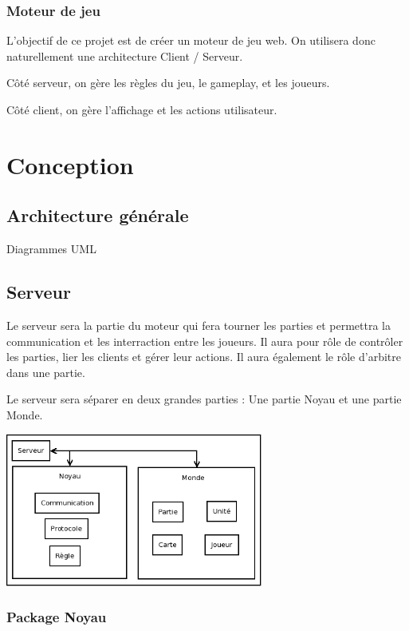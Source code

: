 \documentclass[a4paper,10pt]{report}
\begin{document}
      \subsection{Moteur de jeu}

	L'objectif de ce projet est de créer un moteur de jeu web. On utilisera donc naturellement une architecture Client / Serveur. 

	Côté serveur, on gère les règles du jeu, le gameplay, et les joueurs. 

	Côté client, on gère l'affichage et les actions utilisateur. 


  \chapter{Conception}

    \section{Architecture générale}

      Diagrammes UML


    \section{Serveur}

      Le serveur sera la partie du moteur qui fera tourner les parties et permettra la communication et les interraction entre les joueurs. Il aura pour rôle de contrôler les parties, lier les clients et gérer leur actions. Il aura également le rôle d'arbitre dans une partie. 

      Le serveur sera séparer en deux grandes parties : Une partie Noyau et une partie Monde.

      \includegraphics[width=320px]{img/server-organisation.png}

      \subsection{Package Noyau}
\end{document}

